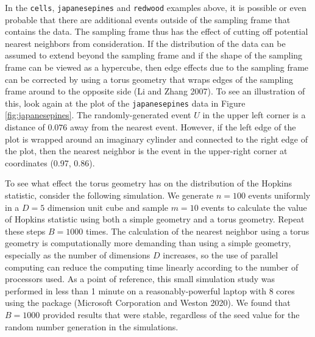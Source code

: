 In the \texttt{cells}, \texttt{japanesepines} and \texttt{redwood} examples above, it is possible or even probable that there are additional events outside of the sampling frame that contains the data. The sampling frame thus has the effect of cutting off potential nearest neighbors from consideration. If the distribution of the data can be assumed to extend beyond the sampling frame and if the shape of the sampling frame can be viewed as a hypercube, then edge effects due to the sampling frame can be corrected by using a torus geometry that wraps edges of the sampling frame around to the opposite side (Li and Zhang 2007). To see an illustration of this, look again at the plot of the \texttt{japanesepines} data in Figure \ref{fig:japanesepines}. The randomly-generated event \(U\) in the upper left corner is a distance of \(0.076\) away from the nearest event. However, if the left edge of the plot is wrapped around an imaginary cylinder and connected to the right edge of the plot, then the nearest neighbor is the event in the upper-right corner at coordinates (0.97, 0.86).

To see what effect the torus geometry has on the distribution of the Hopkins statistic, consider the following simulation. We generate \(n=100\) events uniformly in a \(D=5\) dimension unit cube and sample \(m=10\) events to calculate the value of Hopkins statistic using both a simple geometry and a torus geometry. Repeat these steps \(B=1000\) times. The calculation of the nearest neighbor using a torus geometry is computationally more demanding than using a simple geometry, especially as the number of dimensions \(D\) increases, so the use of parallel computing can reduce the computing time linearly according to the number of processors used. As a point of reference, this small simulation study was performed in less than 1 minute on a reasonably-powerful laptop with 8 cores using the  package (Microsoft Corporation and Weston 2020). We found that \(B=1000\) provided results that were stable, regardless of the seed value for the random number generation in the simulations.

